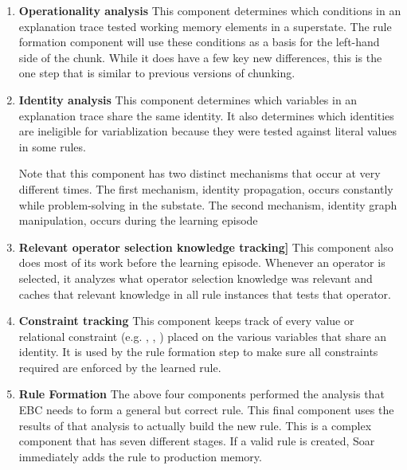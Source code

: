 \begin{enumerate}
	\item \textbf{Operationality analysis} \newline
	This component determines which conditions in an explanation trace tested working memory elements in a superstate.  The rule formation component will use these conditions as a basis for the left-hand side of the chunk.  While it does have a few key new differences, this is the one step that is similar to previous versions of chunking.

	\item \textbf{Identity analysis}  \newline
	This component determines which variables in an explanation trace share the same identity.  It also determines which identities are ineligible for variablization because they were tested against literal values in some rules.  

	Note that this component has two distinct mechanisms that occur at very different times.  The first mechanism, identity propagation, occurs constantly while problem-solving in the substate.  The second mechanism, identity graph manipulation, occurs during the learning episode

	\item \textbf{Relevant operator selection knowledge tracking]} \newline
	This component also does most of its work before the learning episode.  Whenever an operator is selected, it analyzes what operator selection knowledge was relevant and caches that relevant knowledge in all rule instances that tests that operator. 

	\item \textbf{Constraint tracking} \newline
	This component keeps track of every value or relational constraint (e.g. , , ) placed on the various variables that share an identity.  It is used by the rule formation step to make sure all constraints required are enforced by the learned rule.

	\item \textbf{Rule Formation} \newline
	The above four components performed the analysis that EBC needs to form a general but correct rule.  This final component uses the results of that analysis to actually build the new rule.  This is a complex component that has seven different stages.  If a valid rule is created, Soar immediately adds the rule to production memory.
\end{enumerate}

